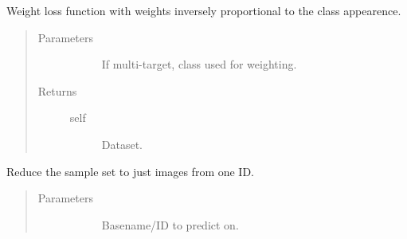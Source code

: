 \documentclass[letterpaper,10pt,english]{sphinxmanual}
\begin{document}
\begin{fulllineitems}
\begin{fulllineitems}
\begin{quote}
\begin{description}
\begin{description}
\end{description}

\end{description}\end{quote}

\end{fulllineitems}


\begin{fulllineitems}
\label{\detokenize{index:pathflowai.datasets.DynamicImageDataset.get_class_weights}}
Weight loss function with weights inversely proportional to the class appearence.
\begin{quote}\begin{description}
\item[{Parameters}] \leavevmode\begin{description}
\item[{}] \leavevmode
If multi-target, class used for weighting.

\end{description}

\item[{Returns}] \leavevmode\begin{description}
\item[{self}] \leavevmode
Dataset.

\end{description}

\end{description}\end{quote}

\end{fulllineitems}


\begin{fulllineitems}
\label{\detokenize{index:pathflowai.datasets.DynamicImageDataset.retain_ID}}
Reduce the sample set to just images from one ID.
\begin{quote}\begin{description}
\item[{Parameters}] \leavevmode\begin{description}
\item[{}] \leavevmode
Basename/ID to predict on.


\end{description}
\end{description}
\end{quote}
\end{fulllineitems}
\end{fulllineitems}
\end{document}

